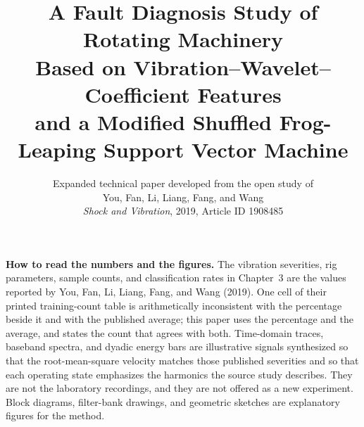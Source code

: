 \documentclass[12pt,a4paper]{report}
\title{%
A Fault Diagnosis Study of Rotating Machinery\\[0.4em]
\large Based on Vibration--Wavelet--Coefficient Features\\
and a Modified Shuffled Frog-Leaping Support Vector Machine}
\author{Expanded technical paper developed from the open study of\\
You, Fan, Li, Liang, Fang, and Wang\\
\textit{Shock and Vibration}, 2019, Article ID 1908485}
\date{}
\begin{document}
\maketitle
\setcounter{page}{2}
\thispagestyle{empty}

\begin{center}
\begin{minipage}{0.92\textwidth}
\setlength{\parskip}{0.6em}
\small
\textbf{How to read the numbers and the figures.}
The vibration severities, rig parameters, sample counts, and classification rates in Chapter~3 are the values reported by You, Fan, Li, Liang, Fang, and Wang (2019).
One cell of their printed training-count table is arithmetically inconsistent with the percentage beside it and with the published average; this paper uses the percentage and the average, and states the count that agrees with both.
Time-domain traces, baseband spectra, and dyadic energy bars are illustrative signals synthesized so that the root-mean-square velocity matches those published severities and so that each operating state emphasizes the harmonics the source study describes.
They are not the laboratory recordings, and they are not offered as a new experiment.
Block diagrams, filter-bank drawings, and geometric sketches are explanatory figures for the method.
\end{minipage}
\end{center}
\end{document}

